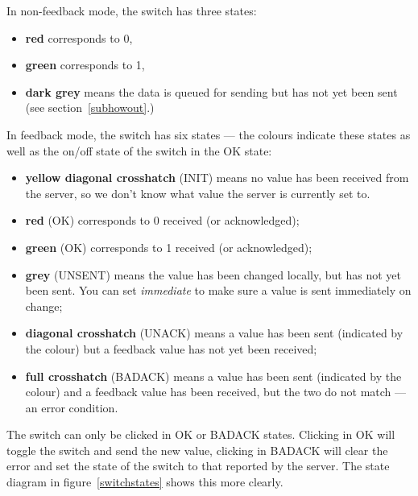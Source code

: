 In non-feedback mode, the switch has three states:
\begin{itemize}
\item \textbf{red} corresponds to 0,
\item \textbf{green} corresponds to 1,
\item \textbf{dark grey} means the data is queued for sending but has not yet been sent (see section~\ref{subhowout}.)
\end{itemize}
In feedback mode, the switch has six states --- the colours indicate these states as well
as the on/off state of the switch in the OK state:
\begin{itemize}
\item \textbf{yellow diagonal crosshatch} (INIT) means no value has been received from the server,
so we don't know what value the server is currently set to.
\item \textbf{red} (OK) corresponds to 0 received (or acknowledged);
\item \textbf{green} (OK) corresponds to 1 received (or acknowledged);
\item \textbf{grey} (UNSENT) means the value has been changed locally, but has not yet been sent. You can set \emph{immediate} to
make sure a value is sent immediately on change;
\item \textbf{diagonal crosshatch} (UNACK) means a value has been sent (indicated by the colour) but a feedback value has
not yet been received;
\item \textbf{full crosshatch} (BADACK) means a value has been sent (indicated by the colour) and a feedback value has
been received, but the two do not match --- an error condition.
\end{itemize}
The switch can only be clicked in OK or BADACK states. Clicking in OK will toggle the switch and
send the new value, clicking in BADACK will clear the error and set the state of the switch
to that reported by the server. The state diagram in figure~\ref{switchstates} shows this
more clearly.
